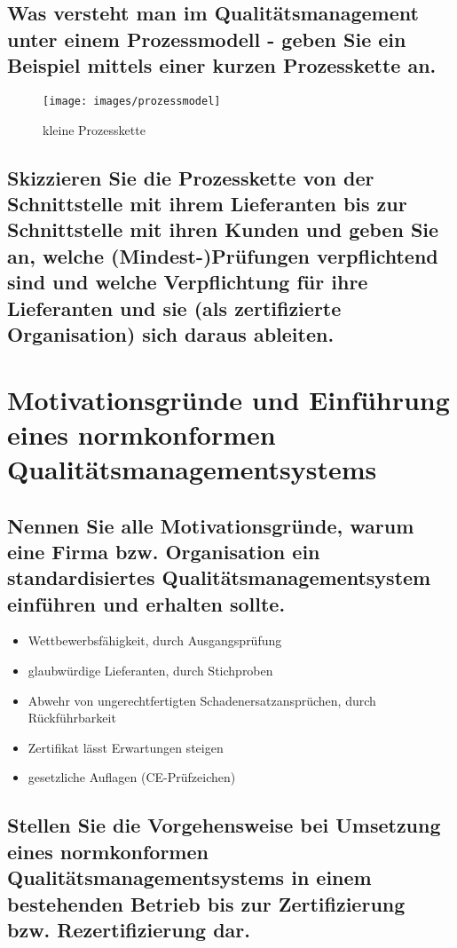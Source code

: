 	\subsection{Was versteht man im Qualitätsmanagement unter einem Prozessmodell - geben Sie ein Beispiel mittels einer kurzen Prozesskette an.}

		\begin{figure}[!h]
			\begin{center}
				\texttt{[image: images/prozessmodel]}
				\caption{kleine Prozesskette}
			\end{center}
		\end{figure}
	\subsection{Skizzieren Sie die Prozesskette von der Schnittstelle mit ihrem Lieferanten bis zur Schnittstelle mit ihren Kunden und geben Sie an, welche (Mindest-)Prüfungen verpflichtend sind und welche Verpflichtung für ihre Lieferanten und sie (als zertifizierte Organisation) sich daraus ableiten.}

\section{Motivationsgründe und Einführung eines normkonformen Qualitätsmanagementsystems}

	\subsection{Nennen Sie alle Motivationsgründe, warum eine Firma bzw. Organisation ein standardisiertes Qualitätsmanagementsystem einführen und erhalten sollte.}
	
	\begin{itemize}
		\item Wettbewerbsfähigkeit, durch Ausgangsprüfung
		\item glaubwürdige Lieferanten, durch Stichproben
		\item Abwehr von ungerechtfertigten Schadenersatzansprüchen, durch Rückführbarkeit
		\item Zertifikat lässt Erwartungen steigen
		\item gesetzliche Auflagen (CE-Prüfzeichen)
	\end{itemize}
	
	\subsection{Stellen Sie die Vorgehensweise bei Umsetzung eines normkonformen Qualitätsmanagementsystems in einem bestehenden Betrieb bis zur Zertifizierung bzw. Rezertifizierung dar.}
	
